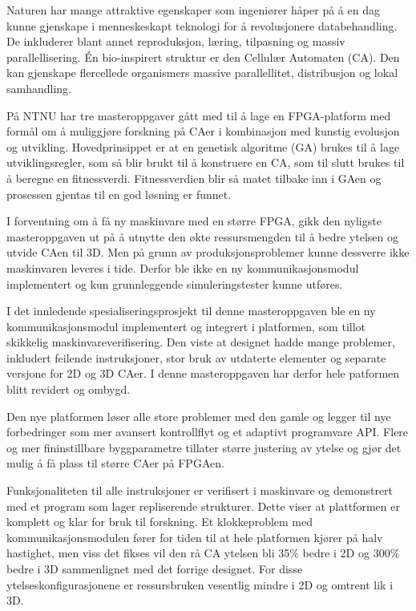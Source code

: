 Naturen har mange attraktive egenskaper som ingeniører håper på å en dag kunne gjenskape i menneskeskapt teknologi for å revolusjonere databehandling.
De inkluderer blant annet reproduksjon, læring, tilpasning og massiv parallellisering.
Én bio-inspirert struktur er den Cellulær Automaten (CA).
Den kan gjenskape flercellede organismers massive parallellitet, distribusjon og lokal samhandling.

På NTNU har tre masteroppgaver gått med til å lage en FPGA-platform med formål om å muliggjøre forskning på CAer i kombinasjon med kunstig evolusjon og utvikling.
Hovedprinsippet er at en genetisk algoritme (GA) brukes til å lage utviklingsregler, som så blir brukt til å konstruere en CA, som til slutt brukes til å beregne en fitnessverdi.
Fitnessverdien blir så matet tilbake inn i GAen og prosessen gjentas til en god løsning er funnet.

I forventning om å få ny maskinvare med en større FPGA, gikk den nyligste masteroppgaven ut på å utnytte den økte ressursmengden til å bedre ytelsen og utvide CAen til 3D.
Men på grunn av produksjonsproblemer kunne dessverre ikke maskinvaren leveres i tide.
Derfor ble ikke en ny kommunikasjonsmodul implementert og kun grunnleggende simuleringstester kunne utføres.

I det innledende spesialiseringsprosjekt til denne masteroppgaven ble en ny kommunikasjonsmodul implementert og integrert i platformen, som tillot skikkelig maskinvareverifisering.
Den viste at designet hadde mange problemer, inkludert feilende instruksjoner, stor bruk av utdaterte elementer og separate versjone for 2D og 3D CAer.
I denne masteroppgaven har derfor hele patformen blitt revidert og ombygd.

Den nye platformen løser alle store problemer med den gamle og legger til nye forbedringer som mer avansert kontrollflyt og et adaptivt programvare API.
Flere og mer fininstillbare byggparametre tillater større justering av ytelse og gjør det mulig å få plass til større CAer på FPGAen.

Funksjonaliteten til alle instruksjoner er verifisert i maskinvare og demonstrert med et program som lager repliserende strukturer.
Dette viser at plattformen er komplett og klar for bruk til forskning.
Et klokkeproblem med kommunikasjonsmodulen fører for tiden til at hele platformen kjører på halv hastighet, men viss det fikses vil den rå CA ytelsen bli 35\% bedre i 2D og 300\% bedre i 3D sammenlignet med det forrige designet.
For disse ytelseskonfigurasjonene er ressursbruken vesentlig mindre i 2D og omtrent lik i 3D.
